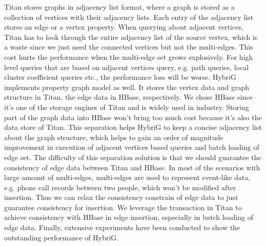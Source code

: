 \begin{eabstract}
	Titan stores graphs in adjacency list format, where a graph is stored as a collection of vertices with their adjacency lists. Each entry of the adjacency list stores an edge or a vertex property. When querying about adjacent vertices, Titan has to look through the entire adjacency list of the source vertex, which is a waste since we just need the connected vertices but not the multi-edges. This cost hurts the performance when the multi-edge set grows explosively. For high level queries that are based on adjacent vertices query, e.g. path queries, local cluster coefficient queries etc., the performance loss will be worse.
	HybriG implements property graph model as well. It stores the vertex data and graph structure in Titan, the edge data in HBase, respectively. We chose HBase since it’s one of the storage engines of Titan and is widely used in industry. Storing part of the graph data into HBase won’t bring too much cost because it’s also the data store of Titan. This separation helps HybriG to keep a concise adjacency list about the graph structure, which helps to gain an order of magnitude improvement in execution of adjacent vertices based queries and batch loading of edge set. The difficulty of this separation solution is that we should guarantee the consistency of edge data between Titan and HBase. In most of the scenarios with large amount of multi-edges, multi-edges are used to represent event-like data, e.g. phone call records between two people, which won’t be modified after insertion. Thus we can relax the consistency constrain of edge data to just guarantee consistency for insertion. We leverage the transaction in Titan to achieve consistency with HBase in edge insertion, especially in batch loading of edge data. Finally, extensive experiments have been conducted to show the outstanding performance of HybriG.
\end{eabstract}

